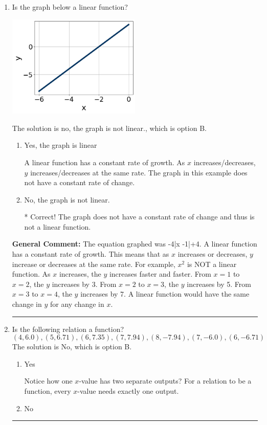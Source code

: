 \documentclass{extbook}[14pt]
\newcommand{\litem}[1]{\item #1

\rule{\textwidth}{0.4pt}}
\begin{document}
\begin{enumerate}\litem{
Is the graph below a linear function?

\begin{center}
    \includegraphics[width=0.5\textwidth]{../Figures/MA_8_F_1_2_graphG.png}
\end{center}


The solution is no, the graph is not linear., which is option B.

\begin{enumerate}[label=\Alph*.]
\item Yes, the graph is linear

A linear function has a constant rate of growth. As $x$ increases/decreases, $y$ increases/decreases at the same rate. The graph in this example does not have a constant rate of change.
\item No, the graph is not linear.

* Correct! The graph does not have a constant rate of change and thus is not a linear function.
\end{enumerate}


\textbf{General Comment:} The equation graphed was -4|x -1|+4. A linear function has a constant rate of growth. This means that as $x$ increases or decreases, $y$ increase or decreases at the same rate. For example, $x^2$ is NOT a linear function. As $x$ increases, the $y$ increases faster and faster. From $x=1$ to $x=2$, the $y$ increases by 3. From $x=2$ to $x=3$, the $y$ increases by 5. From $x=3$ to $x=4$, the $y$ increases by 7. A linear function would have the same change in $y$ for any change in $x$.
}
\litem{
Is the following relation a function?
\[ (4, 6.0), (5, 6.71), (6, 7.35), (7, 7.94), (8, -7.94), (7, -6.0), (6, -6.71) \]The solution is No, which is option B.

\begin{enumerate}[label=\Alph*.]
\item Yes

Notice how one $x$-value has two separate outputs? For a relation to be a function, every $x$-value needs exactly one output.
\item No


\end{enumerate}}
\end{enumerate}
\end{document}
